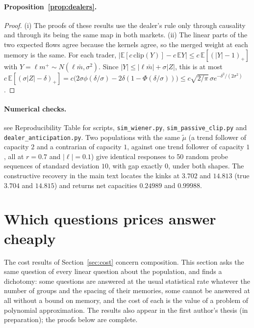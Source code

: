 \documentclass[12pt]{article}
\theoremstyle{definition}
\theoremstyle{remark}
\begin{document}
\paragraph{Proposition~\ref{prop:dealers}.}
\begin{proof}
(i) The proofs of these results use the dealer's rule only through causality and through its being the same map in both markets. (ii) The linear parts of the two expected flows agree because the kernels agree, so the merged weight at each memory is the same. For each trader, $|\mathbb E[c\,\mathrm{clip}(Y)]-c\,\mathbb EY|\le c\,\mathbb E[(|Y|-1)_+]$ with $Y=\ell m^+\sim N(\ell\bar m,\sigma^2)$. Since $|Y|\le|\ell\bar m|+\sigma|Z|$, this is at most $c\,\mathbb E[(\sigma|Z|-\delta)_+]=c\bigl(2\sigma\phi(\delta/\sigma)-2\delta(1-\Phi(\delta/\sigma))\bigr)\le c\sqrt{2/\pi}\,\sigma e^{-\delta^2/(2\sigma^2)}$.
\end{proof}

\paragraph{Numerical checks.} see Reproducibility Table for scripts, \nolinkurl{sim_wiener.py}, \nolinkurl{sim_passive_clip.py} and \nolinkurl{dealer_anticipation.py}. Two populations with the same $\tilde\mu$ (a trend follower of capacity $2$ and a contrarian of capacity $1$, against one trend follower of capacity $1$, all at $r=0.7$ and $|\ell|=0.1$) give identical responses to 50 random probe sequences of standard deviation $10$, with gap exactly $0$, under both shapes. The constructive recovery in the main text locates the kinks at $3.702$ and $14.813$ (true $3.704$ and $14.815$) and returns net capacities $0.24989$ and $0.99988$.

\section{Which questions prices answer cheaply}\label{app:questions}

The cost results of Section~\ref{sec:cost} concern composition. This section asks the same question of every linear question about the population, and finds a dichotomy: some questions are answered at the usual statistical rate whatever the number of groups and the spacing of their memories, some cannot be answered at all without a bound on memory, and the cost of each is the value of a problem of polynomial approximation. The results also appear in the first author's thesis (in preparation); the proofs below are complete.
\end{document}
